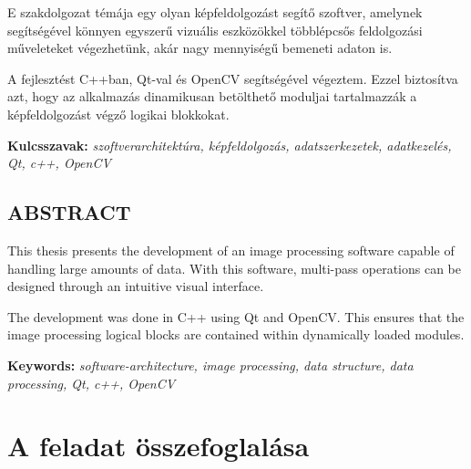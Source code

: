 \documentclass[a4paper,12pt,oneside]{report}
\begin{document}
E szakdolgozat témája egy olyan képfeldolgozást segítő szoftver, amelynek segítségével könnyen egyszerű vizuális eszközökkel többlépcsős feldolgozási műveleteket végezhetünk, akár nagy mennyiségű bemeneti adaton is.

A fejlesztést C++ban, Qt-val és OpenCV segítségével végeztem. Ezzel biztosítva azt, hogy az alkalmazás dinamikusan betölthető moduljai tartalmazzák a képfeldolgozást végző logikai blokkokat.



\vspace{2cm}

{\bf Kulcsszavak:} {\it szoftverarchitektúra, képfeldolgozás, adatszerkezetek, adatkezelés, Qt, c++, OpenCV}
\newpage

\newpage

\begin{center}
\section*{\textbf{\Large \MakeUppercase{Abstract}}}
\end{center}

This thesis presents the development of an image processing software capable of handling large amounts of data. With this software, multi-pass operations can be designed through an intuitive visual interface.

The development was done in C++ using Qt and OpenCV. This ensures that the image processing logical blocks are contained within dynamically loaded modules.

\vspace{2cm}

{\bf Keywords:} {\it software-architecture, image processing, data structure, data processing, Qt, c++, OpenCV}
\newpage

\renewcommand{\thefigure}{\arabic{figure}}


\setcounter{tocdepth}{3} %
\thispagestyle{empty}
\tableofcontents
\pagebreak

\setcounter{page}{1} %
\pagestyle{plain}
\fancyhead[C]{\rightmark}
\fancyfoot[R]{\thepage}

\section{A feladat összefoglalása}
\end{document}
